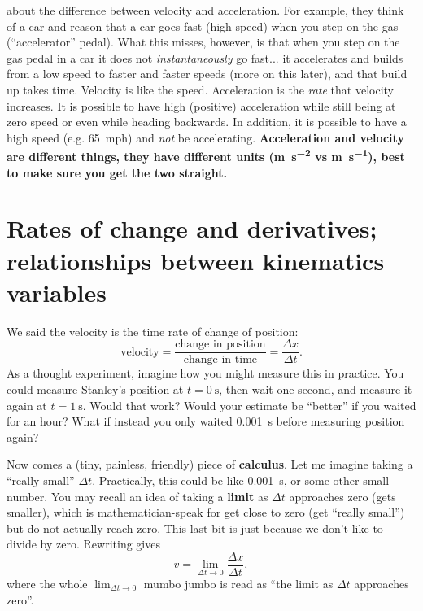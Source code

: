 \documentclass{tufte-handout}
\begin{document}
 about the difference between velocity and acceleration. For example, they think of a car and reason that a car goes fast (high speed) when you step on the gas (``accelerator'' pedal). What this misses, however, is that when you step on the gas pedal in a car it does not \emph{instantaneously} go fast... it accelerates and builds from a low speed to faster and faster speeds (more on this later), and that build up takes time. Velocity is like the speed. Acceleration is the \emph{rate} that velocity increases. It is possible to have high (positive) acceleration while still being at zero speed or even while heading backwards. In addition, it is possible to have a high speed (e.g. \SI{65}{mph}) and \emph{not} be accelerating. \textbf{Acceleration and velocity are different things, they have different units (\si{\meter\per\second\squared} vs \si{\meter\per\second}), best to make sure you get the two straight.} 



\section{Rates of change and derivatives; relationships between kinematics variables}
We said the velocity is the time rate of change of position:
\begin{equation}
\text{velocity} = \dfrac{\text{change in position}}{\text{change in time}} = \dfrac{\Delta x}{\Delta t}.
\label{eq:derivatives1}
\end{equation}
As a thought experiment, imagine how you might measure this in practice. You could measure Stanley's position at $t=\SI{0}{\second}$, then wait one second, and measure it again at $t=\SI{1}{\second}$. Would that work? Would your estimate be ``better'' if you waited for an hour? What if instead you only waited \SI{0.001}{\second} before measuring position again? 

Now comes a (tiny, painless, friendly) piece of \textbf{calculus}\cite{greenspan1987calculus, kreysig2015advanced}. Let me imagine taking a ``really small'' $\Delta t$. Practically, this could be like \SI{0.001}{\second}, or some other small number. You may recall an idea of taking a \textbf{limit} as $\Delta t$ approaches zero (gets smaller), which is mathematician-speak for get close to zero (get ``really small'') but do not actually reach zero. This last bit is just because we don't like to divide by zero. Rewriting  gives
\begin{equation}
v = \lim_{\Delta t\to 0} \dfrac{\Delta x}{\Delta t}, 
\label{eq:derivatives2}
\end{equation}
where the whole $\lim_{\Delta t\to 0}$ mumbo jumbo is read as ``the limit as $\Delta t$ approaches zero''. 
\end{document}
